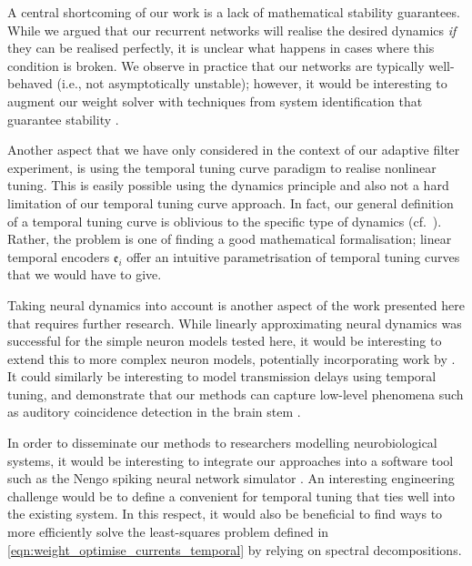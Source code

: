 A central shortcoming of our work is a lack of mathematical stability guarantees.
While we argued that our recurrent networks will realise the desired dynamics \emph{if} they can be realised perfectly, it is unclear what happens in cases where this condition is broken.
We observe in practice that our networks are typically well-behaved (i.e., not asymptotically unstable); however, it would be interesting to augment our weight solver with techniques from system identification that guarantee stability \citep[cf.][]{verhaegen2007filtering}.

Another aspect that we have only considered in the context of our adaptive filter experiment, is using the temporal tuning curve paradigm to realise nonlinear tuning.
This is easily possible using the \NEF dynamics principle \citep[Chapter~8]{eliasmith2003neural} and also not a hard limitation of our temporal tuning curve approach.
In fact, our general definition of a temporal tuning curve is oblivious to the specific type of dynamics (cf.~).
Rather, the problem is one of finding a good mathematical formalisation; linear temporal encoders $\mathfrak{e}_i$ offer an intuitive parametrisation of temporal tuning curves that we would have to give.

Taking neural dynamics into account is another aspect of the work presented here that requires further research.
While linearly approximating neural dynamics was successful for the simple neuron models tested here, it would be interesting to extend this to more complex neuron models, potentially incorporating work by \citet{duggins2017incorporating}.
It could similarly be interesting to model transmission delays using temporal tuning, and demonstrate that our methods can capture low-level phenomena such as auditory coincidence detection in the brain stem \citep[Chapter~31]{kandel2012principles}.

In order to disseminate our methods to researchers modelling neurobiological systems, it would be interesting to integrate our approaches into a software tool such as the Nengo spiking neural network simulator \citep{bekolay2014nengo}.
An interesting engineering challenge would be to define a convenient \API for temporal tuning that ties well into the existing system.
In this respect, it would also be beneficial to find ways to more efficiently solve the least-squares problem defined in \cref{eqn:weight_optimise_currents_temporal} by relying on spectral decompositions.
